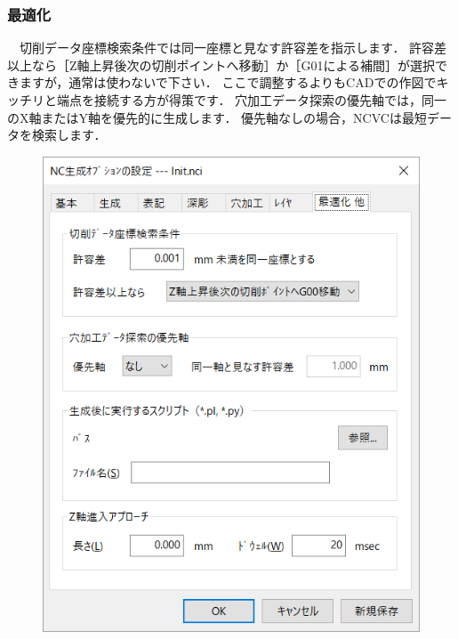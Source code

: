 \subsubsection{最適化}
\begin{minipage}[t]{0.5\textwidth}
　切削データ座標検索条件では同一座標と見なす許容差を指示します．
許容差以上なら［Z軸上昇後次の切削ポイントへ移動］か［G01による補間］が選択できますが，通常は使わないで下さい．
ここで調整するよりもCADでの作図でキッチリと端点を接続する方が得策です．
穴加工データ探索の優先軸では，同一のX軸またはY軸を優先的に生成します．
優先軸なしの場合，NCVCは最短データを検索します．
\end{minipage}
\begin{minipage}[t]{0.5\textwidth}
\vspace*{-2zh}
\begin{figure}[H]
\centering
\includegraphics[scale=0.7]{No6/fig/init7.png}
\label{fig:init7.png}
\end{figure}
\end{minipage}

